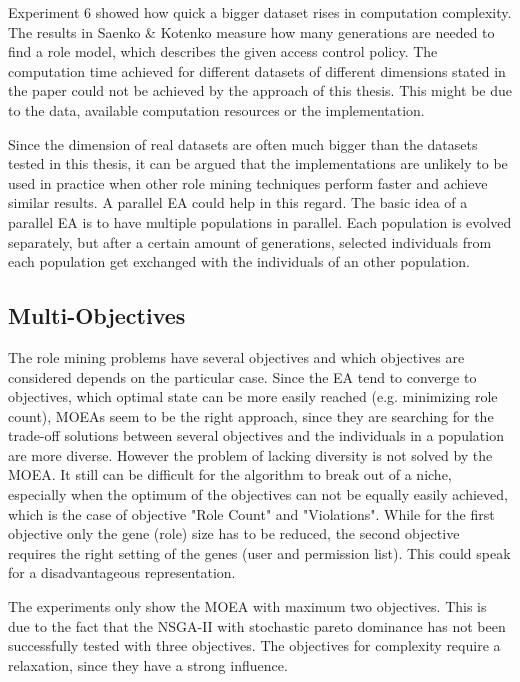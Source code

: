 	Experiment 6 showed how quick a bigger dataset rises in computation complexity. The results in Saenko \& Kotenko\cite{saenko2012design} measure how many generations are needed to find a role model, which describes the given access control policy. The computation time achieved for different datasets of different dimensions stated in the paper could not be achieved by the approach of this thesis. This might be due to the data, available computation resources or the implementation.
	
	Since the dimension of real datasets are often much bigger than the datasets tested in this thesis, it can be argued that the implementations are unlikely to be used in practice when other role mining techniques perform faster and achieve similar results. A parallel EA could help in this regard. The basic idea of a parallel EA is to have multiple populations in parallel. Each population is evolved separately, but after a certain amount of generations, selected individuals from each population get exchanged with the individuals of an other population.\cite{Eiben}
	
\subsection*{Multi-Objectives}
	The role mining problems have several objectives and which objectives are considered depends on the particular case. Since the EA tend to converge to objectives, which optimal state can be more easily reached (e.g. minimizing role count), MOEAs seem to be the right approach, since they are searching for the trade-off solutions between several objectives and the individuals in a population are more diverse. However the problem of lacking diversity is not solved by the MOEA. It still can be difficult for the algorithm to break out of a niche, especially when the optimum of the objectives can not be equally easily achieved, which is the case of objective "Role Count" and "Violations". While for the first objective only the gene (role) size has to be reduced, the second objective requires the right setting of the genes (user and permission list). This could speak for a disadvantageous representation.
	
	The experiments only show the MOEA with maximum two objectives. This is due to the fact that the NSGA-II with stochastic pareto dominance has not been successfully tested with three objectives. The objectives for complexity require a relaxation, since they have a strong influence.
	
